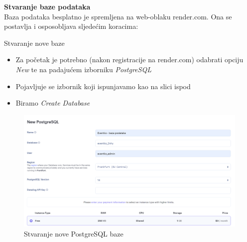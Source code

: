 			\noindent \textbf{Stvaranje baze podataka}\\
			
			\indent Baza podataka besplatno je spremljena na web-oblaku render.com. Ona se postavlja i osposobljava sljedećim koracima:
			
			\begin{packed_enum}
				\item Stvaranje nove baze
				\begin{itemize}
					\item Za početak je potrebno (nakon registracije na render.com) odabrati opciju \textit{New} te na padajućem izborniku \textit{PostgreSQL}
					\item Pojavljuje se izbornik koji ispunjavamo kao na slici ispod
					\item Biramo \textit{Create Database}
				\end{itemize}
				\begin{figure}[H]
					\includegraphics[width=\textwidth]{Opis deploymenta/Slika1.png}
					\caption{Stvaranje nove PostgreSQL baze}
				\end{figure}
				\eject
			

\end{packed_enum}
